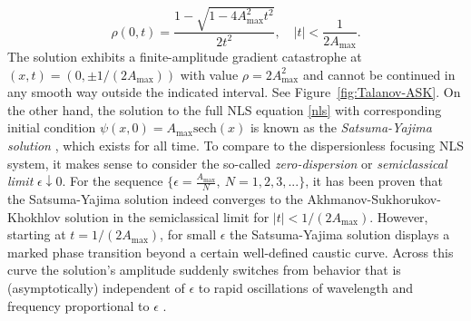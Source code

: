 \documentclass[12pt]{amsart}
\numberwithin{equation}{section}
\begin{document}
\begin{equation}
\rho(0,t)=\frac{1-\sqrt{1-4A_\mathrm{max}^2t^2}}{2t^2},\quad |t|<\frac{1}{2A_\mathrm{max}}.  
\end{equation}
The solution exhibits a 
finite-amplitude gradient catastrophe at $(x,t)=(0,\pm 1/(2A_\mathrm{max}))$ 
with value $\rho=2A_\mathrm{max}^2$ and cannot be continued in 
any smooth way outside the indicated interval.  See 
Figure~\ref{fig:Talanov-ASK}.  On the other hand, the solution to the full 
NLS equation \eqref{nls} with corresponding initial condition 
$\psi(x,0)=A_\mathrm{max}\mathrm{sech}(x)$ is known as the 
\emph{Satsuma-Yajima solution} \cite{SatsumaY74}, which exists for all time.  
To compare to the dispersionless focusing NLS system, it makes sense to 
consider the so-called \emph{zero-dispersion} or \emph{semiclassical limit} 
$\epsilon\downarrow 0$.  For the sequence 
$\{\epsilon=\frac{A_\mathrm{max}}{N},\ N=1,2,3,...\}$, it has been proven 
\cite{Kamvissis:2003} that the Satsuma-Yajima solution indeed converges to the 
Akhmanov-Sukhorukov-Khokhlov solution in the semiclassical limit for 
$|t|<1/(2A_\mathrm{max})$.  However, starting at $t=1/(2A_\mathrm{max})$, for 
small $\epsilon$ the Satsuma-Yajima solution displays a marked phase transition beyond 
a certain well-defined caustic curve.  Across this curve the solution's 
amplitude suddenly switches from behavior that is (asymptotically) 
independent of $\epsilon$ to rapid oscillations of wavelength and frequency proportional 
to $\epsilon$ \cite{Kamvissis:2003}.  
\end{document}
